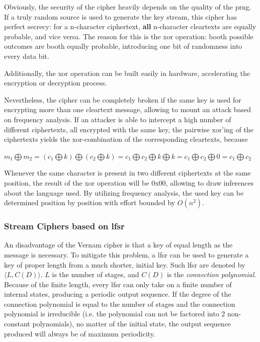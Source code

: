 Obviously, the security of the cipher heavily depends on the quality of the \gls{prng}. If a truly random source is used to generate the key stream, this cipher
has perfect secrecy: for a n-character ciphertext, \textbf{all} n-character cleartexts are equally probable, and vice versa. 
The reason for this is the \gls{xor} operation: booth possible outcomes are booth equally probable, introducing one bit of randomness into every data bit. 

Additionally, the \gls{xor} operation can be built easily in hardware, accelerating the encryption or decryption process.

Nevertheless, the cipher can be completely broken if the same key is used for encrypting more than one cleartext message, allowing to mount
an attack based on frequency analysis.
If an attacker is able to intercept a high number of different ciphertexts, all encrypted with the same key, the pairwise xor'ing of the ciphertexts
yields the xor-combination of the corresponding cleartexts, because
\begin{center}
 $m_1 \bigoplus m_2 = (c_1 \bigoplus k) \bigoplus (c_2 \bigoplus k) = c_1 \bigoplus c_2 \bigoplus k \bigoplus k = c_1 \bigoplus c_2 \bigoplus 0 = c_1 \bigoplus c_2$
\end{center}

Whenever the same character is present in two different ciphertexts at the same position, the result of the \gls{xor} operation will be 0x00, allowing to draw
inferences about the language used. By utilizing frequency analysis, the used key can be determined position by position with effort bounded by $O(n^2)$.

\subsubsection{Stream Ciphers based on \gls{lfsr}}

An disadvantage of the Vernam cipher is that a key of equal length as the message is necessary. To mitigate this problem, a \gls{lfsr} can be used to generate
a key of proper length from a much shorter, initial key. Such \gls{lfsr} are denoted by $\langle L, C(D) \rangle$. $L$ is the number of stages, and $C(D)$ is the
\textit{connection polynomial}. Because of the finite length, every \gls{lfsr} can only take on a finite number of internal states, producing
a periodic output sequence.
If the degree of the connection polynomial is equal to the number of stages and the connection polynomial is irreducible (i.e. the polynomial can not
be factored into 2 non-constant polynomials), no matter of the initial state, the output sequence produced will always be of maximum periodicity.

